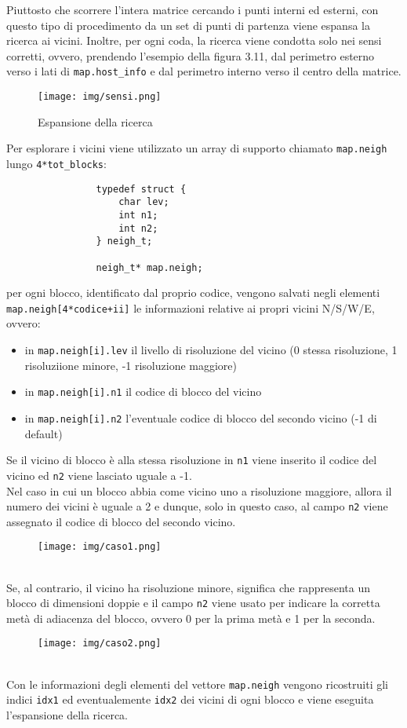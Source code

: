 			Piuttosto che scorrere l'intera matrice cercando i punti interni ed esterni, con questo tipo di procedimento da un set di punti di partenza viene espansa la ricerca ai vicini. Inoltre, per ogni coda, la ricerca viene condotta solo nei sensi corretti, ovvero, prendendo l'esempio della figura 3.11,  dal perimetro esterno verso i lati di \texttt{map.host\_info} e dal perimetro interno verso il centro della matrice.
			\begin{figure}[htbp]
				\centering
				\texttt{[image: img/sensi.png]}
				\caption{Espansione della ricerca}
			\end{figure}

			Per esplorare i vicini viene utilizzato un array di supporto chiamato \texttt{map.neigh} lungo \texttt{4*tot\_blocks}:
			\begin{verbatim}
				typedef struct {
				    char lev;
				    int n1;
				    int n2;
				} neigh_t;

				neigh_t* map.neigh;
			\end{verbatim}
			per ogni blocco, identificato dal proprio codice, vengono salvati negli elementi \texttt{map.neigh[4*codice+ii]} le informazioni relative ai propri vicini N/S/W/E, ovvero:
			\begin{itemize}
				\item in \texttt{map.neigh[i].lev} il livello di risoluzione del vicino (0 stessa risoluzione, 1 risoluziione minore, -1 risoluzione maggiore)
				\item in \texttt{map.neigh[i].n1} il codice di blocco del vicino
				\item in \texttt{map.neigh[i].n2} l'eventuale codice di blocco del secondo vicino (-1 di default)
			\end{itemize}
			Se il vicino di blocco \`{e} alla stessa risoluzione in \texttt{n1} viene inserito il codice del vicino ed \texttt{n2} viene lasciato uguale a -1.\\
			Nel caso in cui un blocco abbia come vicino uno a risoluzione maggiore, allora il numero dei vicini \`{e} uguale a 2 e dunque, solo in questo caso, al campo \texttt{n2} viene assegnato il codice di blocco del secondo vicino. 
			\begin{figure}[htbp]
				\centering
				\texttt{[image: img/caso1.png]}
			\end{figure}\\
			Se, al contrario, il vicino ha risoluzione minore, significa che rappresenta un blocco di dimensioni doppie e il campo \texttt{n2} viene usato per indicare la corretta met\`{a} di adiacenza del blocco, ovvero 0 per la prima met\`{a} e 1 per la seconda.
			\begin{figure}[htbp]
				\centering
				\texttt{[image: img/caso2.png]}
			\end{figure}\\  
			Con le informazioni degli elementi del vettore \texttt{map.neigh} vengono ricostruiti gli indici \texttt{idx1} ed eventualemente \texttt{idx2} dei vicini di ogni blocco e viene eseguita l'espansione della ricerca.

